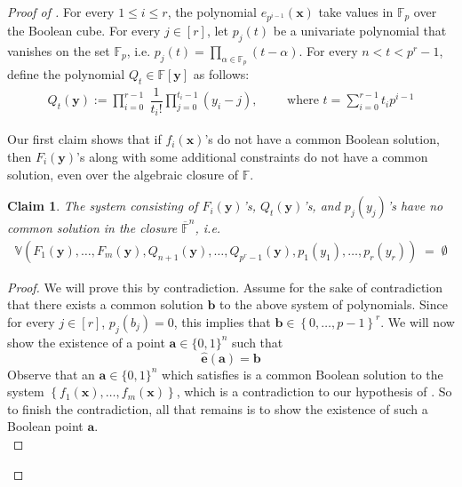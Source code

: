 \documentclass[11pt]{article}
\newtheorem{claim}[theorem]{Claim}
\newcommand{\Boo}{\{0,1 \}}
\newcommand{\paren}[1]{\left( #1 \right)}
\newcommand{\set}[1]{\left\{ #1 \right\}}
\newcommand{\F}{\mathbb{F}}
\begin{document}
\begin{proof}[Proof of ]
\noindent
For every $1 \leq i \leq r$, the polynomial $e_{p^{i-1}}(\mathbf{x})$ take values in $\F_{p}$ over the Boolean cube. For every $j \in [r]$, let $p_{j}(t)$ be a univariate polynomial that vanishes on the set $\F_{p}$, i.e. $p_{j}(t) = \prod_{\alpha \in \F_{p}} (t - \alpha)$.\newline
For every $n < t < p^{r}-1$, define the polynomial $Q_{t} \in \F[\mathbf{y}]$ as follows:
\begin{align*}
    Q_{t}(\mathbf{y}) := \prod_{i=0}^{r-1} \; \dfrac{1}{t_i!}\prod_{j = 0}^{t_i-1} \paren{y_{i} - j}, \quad \quad \text{ where } t = \sum_{i=0}^{r-1} t_{i} p^{i-1}
\end{align*}

\noindent
Our first claim shows that if $f_{i}(\mathbf{x})$'s do not have a common Boolean solution, then $F_{i}(\mathbf{y})$'s along with some additional constraints do not have a common solution, even over the algebraic closure of $\F$.

\begin{claim}\label{claim:ubd-sym-lifting-char-p}
The system consisting of $F_{i}(\mathbf{y})$'s, $Q_{t}(\mathbf{y})$'s, and $p_{j}(y_{j})$'s have no common solution in the closure $\overline{\F}^{n}$, i.e.
\begin{align*}
    \mathbb{V}(F_{1}(\mathbf{y}), \ldots, F_{m}(\mathbf{y}),Q_{n+1}(\mathbf{y}),\ldots,Q_{p^{r}-1}(\mathbf{y}), p_{1}(y_{1}), \ldots, p_{r}(y_{r})) \; = \; \emptyset
\end{align*}
\end{claim}
\begin{proof}
We will prove this by contradiction. Assume for the sake of contradiction that there exists a common solution $\mathbf{b}$ to the above system of polynomials. Since for every $j \in [r]$, $p_{j}(b_{j}) = 0$, this implies that $\mathbf{b} \in \set{0,\ldots,p-1}^{r}$. We will now show the existence of a point $\mathbf{a} \in \Boo^{n}$ such that
\begin{equation}\label{eqn:ubd-const-char-p-surjective}
    \widehat{\mathbf{e}}(\mathbf{a}) = \mathbf{b}
\end{equation}
Observe that an $\mathbf{a} \in \Boo^{n}$ which satisfies  is a common Boolean solution to the system $\set{f_{1}(\mathbf{x}), \ldots, f_{m}(\mathbf{x})}$, which is a contradiction to our hypothesis of . So to finish the contradiction, all that remains is to show the existence of such a Boolean point $\mathbf{a}$.\\


\end{proof}
\end{proof}
\end{document}
